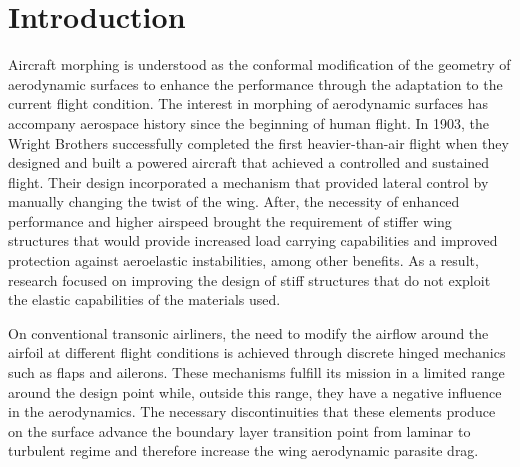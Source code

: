 \chapter{Introduction} \label{chap:introduction}


Aircraft morphing is understood as the conformal modification of the geometry of aerodynamic surfaces to enhance the performance through the adaptation to the current flight condition. The interest in morphing of aerodynamic surfaces has accompany aerospace history since the beginning of human flight. In 1903, the Wright Brothers successfully completed the first heavier-than-air flight when they designed and built a powered aircraft that achieved a controlled and sustained flight. Their design incorporated a mechanism that provided lateral control by manually changing the twist of the wing. After, the necessity of enhanced performance and higher airspeed brought the requirement of stiffer wing structures that would provide increased load carrying capabilities and improved protection against aeroelastic instabilities, among other benefits. As a result, research focused on improving the design of stiff structures that do not exploit the elastic capabilities of the materials used.

On conventional transonic airliners, the need to modify the airflow around the airfoil at different flight conditions is achieved through discrete hinged mechanics such as flaps and ailerons. These mechanisms fulfill its mission in a limited range around the design point while, outside this range, they have a negative influence in the aerodynamics. The necessary discontinuities that these elements produce on the surface advance the boundary layer transition point from laminar to turbulent regime and therefore increase the wing aerodynamic parasite drag. 


